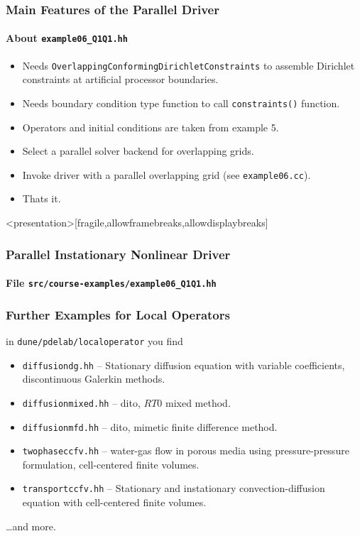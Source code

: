 \begin{frame}
\frametitle{Main Features of the Parallel Driver}
\framesubtitle{About \lstinline{example06_Q1Q1.hh}}
\begin{itemize}
\item Needs \lstinline{OverlappingConformingDirichletConstraints}
to assemble Dirichlet constraints at artificial processor boundaries.
\item Needs boundary condition type function to call \lstinline{constraints()} function.
\item Operators and initial conditions are taken from example 5.
\item Select a parallel solver backend for overlapping grids.
\item Invoke driver with a parallel overlapping grid (see \lstinline{example06.cc}).
\item Thats it.
\end{itemize}
\end{frame}

\begin{frame}<presentation>[fragile,allowframebreaks,allowdisplaybreaks]
\frametitle<presentation>{Parallel Instationary Nonlinear Driver}
\framesubtitle<presentation>{File \texttt{src/course-examples/example06\_Q1Q1.hh}}

\end{frame}

\begin{frame}
\frametitle{Further Examples for Local Operators}
in \lstinline{dune/pdelab/localoperator} you find
\begin{itemize}
\item \lstinline{diffusiondg.hh} -- Stationary diffusion equation with variable coefficients, discontinuous 
Galerkin methods.
\item \lstinline{diffusionmixed.hh} -- dito, $RT0$ mixed method.
\item \lstinline{diffusionmfd.hh} -- dito, mimetic finite difference method.
\item \lstinline{twophaseccfv.hh} -- water-gas flow in porous media using pressure-pressure formulation,
cell-centered finite volumes.
\item \lstinline{transportccfv.hh} -- Stationary and instationary convection-diffusion equation with cell-centered
finite volumes.
\end{itemize}
\ldots and more.
\end{frame}


\cleardoublepage

